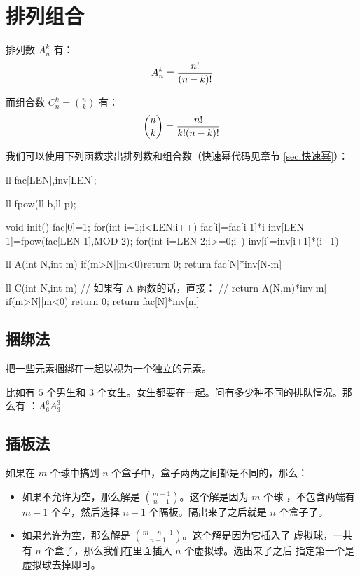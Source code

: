 \section{排列组合}
排列数 $A_n^k$ 有：\[
    A_n^k = {n! \over (n-k)!}
\]

而组合数 $C_n^k = {n \choose k}$ 有：\[
    {n \choose k} = {n! \over k! (n-k)!}
\]

我们可以使用下列函数求出排列数和组合数（快速幂代码见章节 \ref{sec:快速幂}）：
\begin{Cpp}
ll fac[LEN],inv[LEN];

ll fpow(ll b,ll p);

void init(){
  fac[0]=1;
  for(int i=1;i<LEN;i++)
    fac[i]=fac[i-1]*i%
  inv[LEN-1]=fpow(fac[LEN-1],MOD-2);
  for(int i=LEN-2;i>=0;i--)
    inv[i]=inv[i+1]*(i+1)%
}

ll A(int N,int m){
  if(m>N||m<0)return 0;
  return fac[N]*inv[N-m]%
}

ll C(int N,int m){
  // 如果有 A 函数的话，直接：
  // return A(N,m)*inv[m]%
  if(m>N||m<0) return 0;
  return fac[N]*inv[m]%
}
\end{Cpp}



\subsection{捆绑法}

把一些元素捆绑在一起以视为一个独立的元素。

比如有 $5$ 个男生和 $3$ 个女生。女生都要在一起。问有多少种不同的排队情况。那么有
：$A_6^6 A_3^3$



\subsection{插板法}
\label{subsec:插板法} \label{subsec:插空法}

如果在 $m$ 个球中搞到 $n$ 个盒子中，盒子两两之间都是不同的，那么：
\begin{itemize}
    \item 如果不允许为空，那么解是 $m - 1 \choose n - 1$。这个解是因为 $m$ 个球
        ，不包含两端有 $m - 1$ 个空，然后选择 $n - 1$ 个隔板。隔出来了之后就是
        $n$ 个盒子了。
    \item 如果允许为空，那么解是 $m + n - 1 \choose n - 1$。这个解是因为它插入了
        虚拟球，一共有 $n$ 个盒子，那么我们在里面插入 $n$ 个虚拟球。选出来了之后
        指定第一个是虚拟球去掉即可。
\end{itemize}

